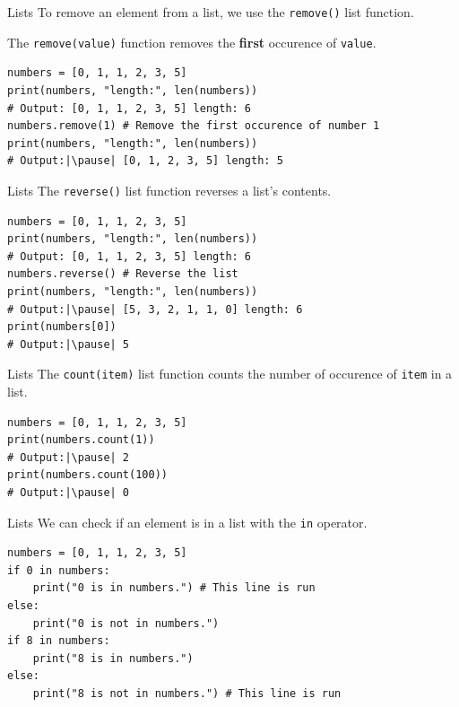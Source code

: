 \documentclass[dvipsnames, svgnames, x11names]{beamer}
\begin{document}
\begin{frame}[fragile]{Lists}
To remove an element from a list, we use the \texttt{remove()} list function.

The \texttt{remove(value)} function removes the \textbf{first} occurence of \texttt{value}. \pause
\begin{verbatim}
numbers = [0, 1, 1, 2, 3, 5]
print(numbers, "length:", len(numbers)) 
# Output: [0, 1, 1, 2, 3, 5] length: 6
numbers.remove(1) # Remove the first occurence of number 1
print(numbers, "length:", len(numbers))
# Output:|\pause| [0, 1, 2, 3, 5] length: 5
\end{verbatim}
\end{frame}

\begin{frame}[fragile]{Lists}
The \texttt{reverse()} list function reverses a list's contents. \pause

\begin{verbatim}
numbers = [0, 1, 1, 2, 3, 5]
print(numbers, "length:", len(numbers)) 
# Output: [0, 1, 1, 2, 3, 5] length: 6
numbers.reverse() # Reverse the list
print(numbers, "length:", len(numbers)) 
# Output:|\pause| [5, 3, 2, 1, 1, 0] length: 6
print(numbers[0])
# Output:|\pause| 5
\end{verbatim}
\end{frame}

\begin{frame}[fragile]{Lists}
The \texttt{count(item)} list function counts the number of occurence of \texttt{item} in a list. \pause

\begin{verbatim}
numbers = [0, 1, 1, 2, 3, 5]
print(numbers.count(1)) 
# Output:|\pause| 2
print(numbers.count(100)) 
# Output:|\pause| 0
\end{verbatim}
\end{frame}

\begin{frame}[fragile]{Lists}
We can check if an element is in a list with the \texttt{in} operator.\pause

\begin{verbatim}
numbers = [0, 1, 1, 2, 3, 5]
if 0 in numbers:
    print("0 is in numbers.") # This line is run
else:
    print("0 is not in numbers.")
if 8 in numbers:
    print("8 is in numbers.")
else:
    print("8 is not in numbers.") # This line is run
\end{verbatim}
\end{frame}
\end{document}
